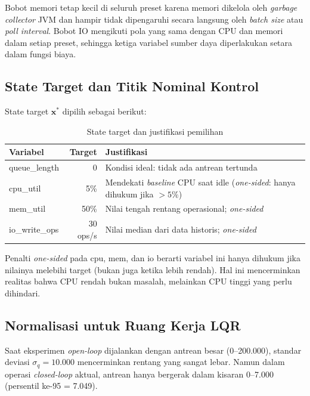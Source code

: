 Bobot memori tetap kecil di seluruh preset karena memori dikelola oleh \emph{garbage collector}
JVM dan hampir tidak dipengaruhi secara langsung oleh \emph{batch size} atau \emph{poll interval}.
Bobot IO mengikuti pola yang sama dengan CPU dan memori dalam setiap preset,
sehingga ketiga variabel sumber daya diperlakukan setara dalam fungsi biaya.

\subsection{State Target dan Titik Nominal Kontrol}

State target $\mathbf{x}^*$ dipilih sebagai berikut:

\begin{table}[H]
    \centering
    \caption{State target dan justifikasi pemilihan}
    \label{tab:state-target}
    \renewcommand{\arraystretch}{1.4}
    \begin{tabular}{|l|r|l|}
    \hline
    \textbf{Variabel} & \textbf{Target} & \textbf{Justifikasi} \\
    \hline
    queue\_length & 0 & Kondisi ideal: tidak ada antrean tertunda \\
    \hline
    cpu\_util & 5\% & Mendekati \emph{baseline} CPU saat idle (\emph{one-sided}: hanya dihukum jika $>5\%$) \\
    \hline
    mem\_util & 50\% & Nilai tengah rentang operasional; \emph{one-sided} \\
    \hline
    io\_write\_ops & 30 ops/s & Nilai median dari data historis; \emph{one-sided} \\
    \hline
    \end{tabular}
\end{table}

Penalti \emph{one-sided} pada cpu, mem, dan io berarti variabel ini hanya dihukum jika nilainya
melebihi target (bukan juga ketika lebih rendah).
Hal ini mencerminkan realitas bahwa CPU rendah bukan masalah, melainkan CPU tinggi yang perlu dihindari.

\subsection{Normalisasi untuk Ruang Kerja LQR}
\label{sec:lqr-norm}

Saat eksperimen \emph{open-loop} dijalankan dengan antrean besar (0--200.000), standar deviasi
$\sigma_q = 10.000$ mencerminkan rentang yang sangat lebar.
Namun dalam operasi \emph{closed-loop} aktual, antrean hanya bergerak dalam kisaran 0--7.000
(persentil ke-95 = 7.049).

